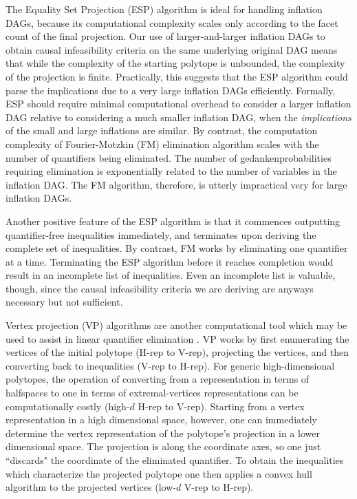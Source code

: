 The Equality Set Projection (ESP) algorithm \cite{jones2004equality,JonesThesis2005} is ideal for handling inflation DAGs, because its computational complexity scales only according to the facet count of the final projection. Our use of larger-and-larger inflation DAGs to obtain causal infeasibility criteria on the same underlying original DAG means that while the complexity of the starting polytope is unbounded, the complexity of the projection is finite. Practically, this suggests that the ESP algorithm could parse the implications due to a very large inflation DAGs efficiently. Formally, ESP should require minimal computational overhead to consider a larger inflation DAG relative to considering a much smaller inflation DAG, when the \emph{implications} of the small and large inflations are similar. By contrast, the computation complexity of Fourier-Motzkin (FM) elimination algorithm scales with the number of quantifiers being eliminated. The number of gedankenprobabilities requiring elimination is exponentially related to the number of variables in the inflation DAG. The FM algorithm, therefore, is utterly impractical very for large inflation DAGs.

Another positive feature of the ESP algorithm is that it commences outputting quantifier-free inequalities immediately, and terminates upon deriving the complete set of inequalities. By contrast, FM works by eliminating one quantifier at a time. Terminating the ESP algorithm before it reaches completion would result in an incomplete list of inequalities. Even an incomplete list is valuable, though, since the causal infeasibility criteria we are deriving are anyways necessary but not sufficient.

Vertex projection (VP) algorithms are another computational tool which may be used to assist in linear quantifier elimination \cite{Avis2000lrs}. VP works by first enumerating the vertices of the initial polytope (H-rep to V-rep), projecting the vertices, and then converting back to inequalities (V-rep to H-rep). For generic high-dimensional polytopes, the operation of converting from a representation in terms of halfspaces to one in terms of extremal-vertices representations can be computationally costly (high-$d$ H-rep to V-rep). Starting from a vertex representation in a high dimensional space, however, one can immediately determine the vertex representation of the polytope's projection in a lower dimensional space. The projection is along the coordinate axes, so one just ``discards" the coordinate of the eliminated quantifier. To obtain the inequalities which characterize the projected polytope one then applies a convex hull algorithm to the projected vertices (low-$d$ V-rep to H-rep).

